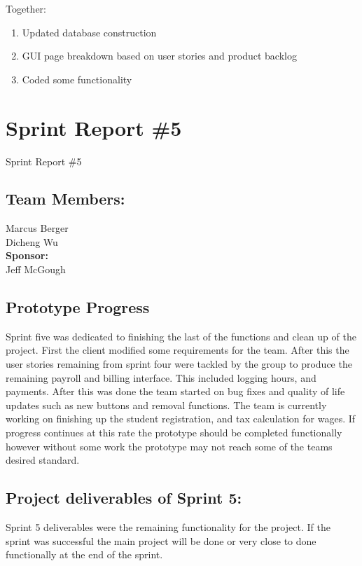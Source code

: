 Together:
\begin{enumerate}
\item Updated database construction
\item GUI page breakdown based on user stories and product backlog
\item Coded some functionality
\end{enumerate}

\section{Sprint Report \#5}

Sprint Report \#5


\subsection{Team Members:}
Marcus Berger
\\Dicheng Wu\\
\textbf{Sponsor:}
\\Jeff McGough
\\

\subsection{Prototype Progress}


Sprint five was dedicated to finishing the last of the functions and clean up of the project. First the client modified  some requirements for the team. After this the user stories remaining from sprint four were tackled by the group to produce the remaining payroll and billing interface. This included logging hours, and payments. After this was done the team started on bug fixes and quality of life updates such as new buttons and removal functions. The team is currently working on finishing up the student registration, and tax calculation for wages. If progress continues at this rate the prototype should be completed functionally however without some work the prototype may not reach some of the teams desired standard.


\subsection{Project deliverables of Sprint 5:}

Sprint 5 deliverables were the remaining functionality for the project. If the sprint was successful the main project will be done or very close to done functionally at the end of the sprint.


